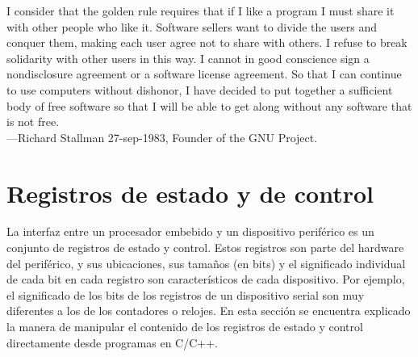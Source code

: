 \documentclass[output=paper, 
colorlinks,
citecolor=brown,
newtxmath
]{langscibook}
\begin{document}
\hfill\begin{minipage}{0.8\linewidth} \footnotesize
I consider that the golden rule requires that if I like a program I 
must share it with other people who like it. 
Software sellers want to divide the users and conquer them, making 
each user agree not to share with others. I refuse to break solidarity 
with other users in this way. I cannot in good conscience sign a
nondisclosure agreement or a software license agreement. 
So that I can continue to use computers
without dishonor, I have decided to put together a sufficient body of free software so that I will be able
to get along without any software that is not free.\\
—Richard Stallman 27-sep-1983, Founder of the GNU Project.
\end{minipage}


\def\maketitle{

 \makeatletter
 {\color{bl} \centering \huge \sc \textbf{
\large \vspace*{-8pt} \color{black} Programación de Sistemas Embebidos
 \vspace*{8pt} }\par}
 \makeatother


 \makeatletter
 {\centering \small 
 	Departamento de Ingeniería de Computadoras \\
 	Facultad de Informática - Universidad Nacional del Comahue \\
 	\vspace{20pt} }
 \makeatother

}








\section {Registros de estado y de control}

La interfaz entre un procesador embebido y un dispositivo periférico
es un conjunto de registros de estado y control. Estos registros son parte
del hardware del periférico, y sus ubicaciones, sus tamaños (en bits) y el
significado individual de cada bit en cada registro son característicos 
de cada dispositivo. Por ejemplo, 
el significado de los bits de los registros de un dispositivo serial son 
muy diferentes a los
de los contadores o relojes. En esta sección se encuentra explicado la 
manera de manipular el contenido de los registros de estado y control
directamente desde programas en C/C++.
\end{document}

